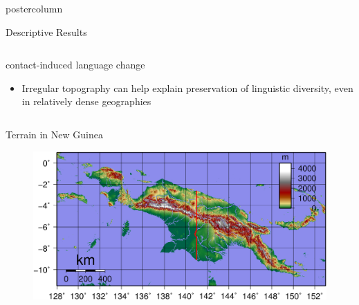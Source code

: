 \documentclass[final,hyperref={pdfpagelabels=false}]{beamer}
\begin{document}
\begin{frame}
\begin{columns}[T]
\begin{column}{.33\textwidth}
\begin{beamercolorbox}[center,wd=\textwidth]{postercolumn}
\begin{minipage}[T]{.95\textwidth}
{\begin{block}{Descriptive Results}
\begin{columns}
\begin{column}{.99\textwidth}
\begin{itemize}
                     contact-induced language change
                      \begin{itemize}
                        \item Irregular topography can help explain preservation of linguistic diversity, even in relatively dense geographies
                      \end{itemize}
                  \end{itemize}
                \end{column}
              \end{columns}
            \end{block}
            \vfill
            \begin{block}{Terrain in New Guinea}
              \begin{figure}[h!]
                \centering
                \includegraphics[width=\linewidth]{images/New_Guinea_Topography}
              \end{figure}
            \end{block}
          }
        \end{minipage}
      \end{beamercolorbox}
    \end{column}


\end{columns}
\end{frame}
\end{document}
